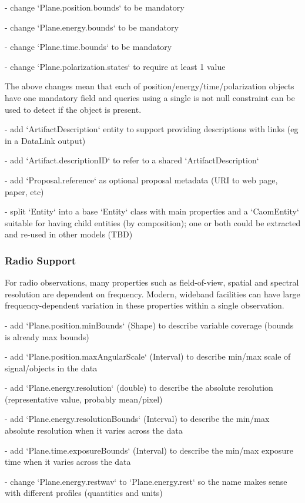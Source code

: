 \documentclass[11pt,a4paper]{ivoa}
\begin{document}
- change `Plane.position.bounds` to be mandatory

- change `Plane.energy.bounds` to be mandatory

- change `Plane.time.bounds` to be mandatory

- change `Plane.polarization.states` to require at least 1 value

The above changes mean that each of position/energy/time/polarization objects 
have one mandatory field and queries using a single is not null constraint
can be used to detect if the object is present.

- add `ArtifactDescription` entity to support providing descriptions with links 
(eg in a DataLink output)

- add `Artifact.descriptionID` to refer to a shared `ArtifactDescription`

- add `Proposal.reference` as optional proposal metadata (URI to web page, paper, etc)

- split `Entity` into a base `Entity` class with main properties and a `CaomEntity` 
suitable for having child entities (by composition); one or both could be extracted 
and re-used in other models (TBD)

\subsubsection{Radio Support}

For radio observations, many properties such as field-of-view, spatial and spectral resolution are dependent on frequency. Modern,
 wideband facilities can have large frequency-dependent variation in these properties within a single observation.

- add `Plane.position.minBounds` (Shape) to describe variable coverage (bounds is already max bounds)

- add `Plane.position.maxAngularScale` (Interval) to describe min/max scale of signal/objects in the data

- add `Plane.energy.resolution` (double) to describe the absolute resolution (representative value, probably mean/pixel)

- add `Plane.energy.resolutionBounds` (Interval) to describe the min/max absolute resolution when it varies across the data

- add `Plane.time.exposureBounds` (Interval) to describe the min/max exposure time when it varies across the data

- change `Plane.energy.restwav` to `Plane.energy.rest` so the name makes sense with different profiles (quantities and units)
\end{document}
